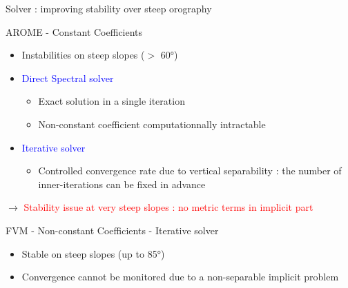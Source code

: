 \documentclass[10pt]{beamer}
\begin{document}
\begin{frame}{Solver : improving stability over steep orography}  
    \vspace{-0.2cm}  
    \begin{block}{AROME - Constant Coefficients}

        \begin{itemize}
            \item[\textcolor{red}{\faIcon{minus}}] \small Instabilities on steep slopes ($>$ 60°)

            \item \textcolor{blue}{Direct Spectral solver}
            \begin{itemize}
                \item[\textcolor{blue}{\faIcon{plus}}] \small  Exact solution in a single iteration 
                \item[\textcolor{red}{\faIcon{minus}}] \small  Non-constant coefficient computationnally intractable 
            \end{itemize}
            \item \textcolor{blue}{Iterative solver}
            \begin{itemize}
                \item[\textcolor{blue}{\faIcon{plus}}] \small Controlled convergence rate due to vertical separability : the number of inner-iterations can be fixed in advance
            \end{itemize}
        \end{itemize}

    $\rightarrow$ \textcolor{red}{Stability issue at very steep slopes : no metric terms in implicit part}
    \end{block}

    \vspace{0.25cm}

    \begin{block}{FVM - Non-constant Coefficients - Iterative solver}
        \begin{itemize}
            \item[\textcolor{blue}{\faIcon{plus}}] \small Stable on steep slopes (up to 85°) 
            \item[\textcolor{red}{\faIcon{minus}}] \small Convergence cannot be monitored due to a non-separable implicit problem
        \end{itemize}
    \end{block}

\end{frame}
\end{document}
